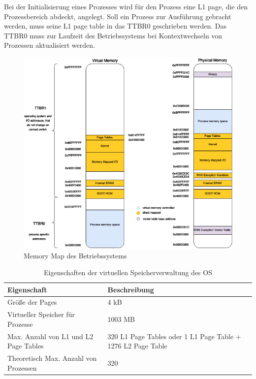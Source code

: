 Bei der Initialisierung eines Prozesses wird für den Prozess eine L1 page, die den Prozessbereich abdeckt, angelegt. Soll ein Prozess zur Ausführung gebracht werden, muss seine L1 page table in das TTBR0 geschrieben werden. Das TTBR0 muss zur Laufzeit des Betriebssystems bei Kontextwechseln von Prozessen aktualisiert werden.\\


\begin{figure}[H]
	\includegraphics[scale=0.60]{figures/MemoryMap}
	\caption{Memory Map des Betriebssystems}
	\label{fig:MemoryMap}
\end{figure}




\begin{table}[H]
\begin{tabular}{p{7cm} | p{7cm}}
  \textbf{Eigenschaft} & \textbf{Beschreibung} \\ \hline
  Größe der Pages & 4 kB\\
  Virtueller Speicher für Prozesse & 1003 MB\\
  Max. Anzahl von L1 und L2 Page Tables & 320 L1 Page Tables oder 1 L1 Page Table + 1276 L2 Page  Table\\
  Theoretisch Max. Anzahl von Prozessen & 320\\
 \end{tabular}
 \caption{Eigenschaften der virtuellen Speicherverwaltung des OS}
 \label{table:SpecifiedVirtualMemory}
\end{table}

